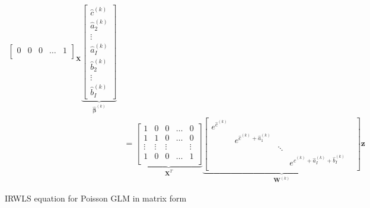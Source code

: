 \documentclass[a4paper]{book}
\begin{document}
\begin{figure}
\begin{displaymath}
\begin{split}
{\begin{bmatrix}
          0      & 0      & 0      & \dots & 1      \\
        \end{bmatrix}
      }_{\mathbf{X}}
      \underbrace{
        \begin{bmatrix}
          \widehat{c}^{(k)} \\ \widehat{a}^{(k)}_2 \\ \vdots \\ \widehat{a}^{(k)}_I \\ \widehat{b}^{(k)}_2 \\ \vdots \\ \widehat{b}^{(k)}_I
        \end{bmatrix}
      }_{\bm{\widehat{\beta}}^{(k)}} \\
      &=%
      \underbrace{
        \begin{bmatrix}
          1      & 0      & 0      & \dots & 0      \\
          1      & 1      & 0      & \dots & 0      \\
          \vdots & \vdots & \vdots &       & \vdots \\
          1      & 0      & 0      & \dots & 1      \\
        \end{bmatrix}
      }_{\mathbf{X}^T}
      \underbrace{
        \begin{bmatrix}
          e^{\widehat{c}^{(k)}} &                                             &        &                                                                     \\
                                & e^{\widehat{c}^{(k)} + \widehat{a}^{(k)}_1} &        &                                                                   & \\
                                &                                             & \ddots &                                                                     \\
                                &                                             &        & e^{\widehat{c}^{(k)} + \widehat{a}^{(k)}_I + \widehat{b}^{(k)}_I}   \\
        \end{bmatrix}
      }_{\mathbf{W}^{(k)}}
      \mathbf{z}
    \end{split}
  \end{displaymath}
  \caption{IRWLS equation for Poisson GLM in matrix form}
  \label{fig:odp-mat-eq}
\end{figure}
\end{document}
